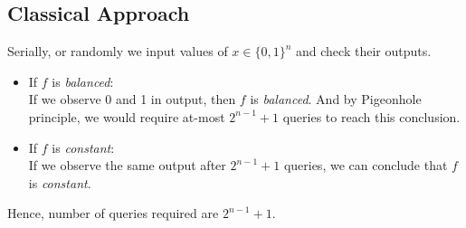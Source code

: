 \documentclass[11.5pt, paper=a4]{article}
\theoremstyle{definition}
\numberwithin{theorem}{section}
\begin{document}
\subsection{Classical Approach}
Serially, or randomly we input values of $x\in\{0,1\}^n$ and check their outputs.
\begin{itemize}
    \item If $f$ is \emph{balanced}:\\If we observe 0 and 1 in output, then $f$ is \emph{balanced}. And by Pigeonhole principle, we would require at-most $2^{n-1}+1$ queries to reach this conclusion.
    \item If $f$ is \emph{constant}:\\If we observe the same output after $2^{n-1}+1$ queries, we can conclude that $f$ is \emph{constant}.
\end{itemize}
Hence, number of queries required are $2^{n-1}+1$.
\end{document}
